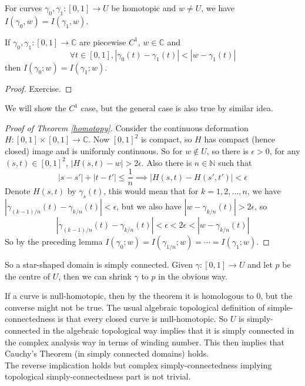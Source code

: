 \begin{theorem}\label{homotopy}
    For curves $\gamma_0,\gamma_1:[0,1]\to U$ be homotopic and $w\neq U$, we have $I(\gamma_0,w)=I(\gamma_1,w)$.
\end{theorem}
\begin{lemma}
    If $\gamma_0,\gamma_1:[0,1]\to\mathbb C$ are piecewise $C^1$, $w\in\mathbb C$ and
    $$\forall t\in [0,1],|\gamma_0(t)-\gamma_1(t)|<|w-\gamma_1(t)|$$
    then $I(\gamma_0;w)=I(\gamma_1;w)$.
\end{lemma}
\begin{proof}
    Exercise.
\end{proof}
We will show the $C^1$ case, but the general case is also true by similar idea.
\begin{proof}[Proof of Theorem \ref{homotopy}]
    Consider the continuous deformation $H:[0,1]\times [0,1]\to\mathbb C$.
    Now $[0,1]^2$ is compact, so $H$ has compact (hence closed) image and is uniformly continuous.
    So for $w\notin U$, so there is $\epsilon>0$, for any $(s,t)\in [0,1]^2$, $|H(s,t)-w|>2\epsilon$.
    Also there is $n\in\mathbb N$ such that
    $$|s-s'|+|t-t'|\le\frac{1}{n}\implies |H(s,t)-H(s',t')|<\epsilon$$
    Denote $H(s,t)$ by $\gamma_s(t)$, this would mean that for $k=1,2,\ldots,n$, we have $|\gamma_{(k-1)/n}(t)-\gamma_{k/n}(t)|<\epsilon$, but we also have $|w-\gamma_{k/n}(t)|>2\epsilon$, so
    $$|\gamma_{(k-1)/n}(t)-\gamma_{k/n}(t)|<\epsilon<2\epsilon<|w-\gamma_{k/n}(t)|$$
    So by the preceding lemma $I(\gamma_0;w)=I(\gamma_{1/n};w)=\cdots=I(\gamma_1;w)$.
\end{proof}
So a star-shaped domain is simply connected.
Given $\gamma:[0,1]\to U$ and let $p$ be the centre of $U$, then we can shrink $\gamma$ to $p$ in the obvious way.
\begin{remark}
    If a curve is null-homotopic, then by the theorem it is homologous to $0$, but the converse might not be true.
    The usual algebraic topological definition of simple-connectedness is that every closed curve is null-homotopic.
    So $U$ is simply-connected in the algebraic topological way implies that it is simply connected in the complex analysis way in terms of winding number.
    This then implies that Cauchy's Theorem (in simply connected domains) holds.\\
    The reverse implication holds but complex simply-connectedness implying topological simply-connectedness part is not trivial.
\end{remark}